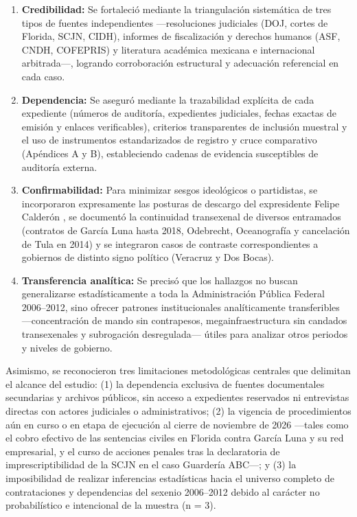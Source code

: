 \begin{enumerate}
  \item \textbf{Credibilidad:} Se fortaleció mediante la triangulación sistemática de tres tipos de fuentes independientes ---resoluciones judiciales (DOJ, cortes de Florida, SCJN, CIDH), informes de fiscalización y derechos humanos (ASF, CNDH, COFEPRIS) y literatura académica mexicana e internacional arbitrada---, logrando corroboración estructural y adecuación referencial en cada caso.
  
  \item \textbf{Dependencia:} Se aseguró mediante la trazabilidad explícita de cada expediente (números de auditoría, expedientes judiciales, fechas exactas de emisión y enlaces verificables), criterios transparentes de inclusión muestral y el uso de instrumentos estandarizados de registro y cruce comparativo (Apéndices A y B), estableciendo cadenas de evidencia susceptibles de auditoría externa.
  
  \item \textbf{Confirmabilidad:} Para minimizar sesgos ideológicos o partidistas, se incorporaron expresamente las posturas de descargo del expresidente Felipe Calderón \citep{infobae2024,elfinanciero2025}, se documentó la continuidad transexenal de diversos entramados (contratos de García Luna hasta 2018, Odebrecht, Oceanografía y cancelación de Tula en 2014) y se integraron casos de contraste correspondientes a gobiernos de distinto signo político (Veracruz y Dos Bocas).
  
  \item \textbf{Transferencia analítica:} Se precisó que los hallazgos no buscan generalizarse estadísticamente a toda la Administración Pública Federal 2006--2012, sino ofrecer patrones institucionales analíticamente transferibles ---concentración de mando sin contrapesos, megainfraestructura sin candados transexenales y subrogación desregulada--- útiles para analizar otros periodos y niveles de gobierno.
\end{enumerate}

Asimismo, se reconocieron tres limitaciones metodológicas centrales que delimitan el alcance del estudio: (1) la dependencia exclusiva de fuentes documentales secundarias y archivos públicos, sin acceso a expedientes reservados ni entrevistas directas con actores judiciales o administrativos; (2) la vigencia de procedimientos aún en curso o en etapa de ejecución al cierre de noviembre de 2026 ---tales como el cobro efectivo de las sentencias civiles en Florida contra García Luna y su red empresarial, y el curso de acciones penales tras la declaratoria de imprescriptibilidad de la SCJN en el caso Guardería ABC---; y (3) la imposibilidad de realizar inferencias estadísticas hacia el universo completo de contrataciones y dependencias del sexenio 2006--2012 debido al carácter no probabilístico e intencional de la muestra (n = 3).

